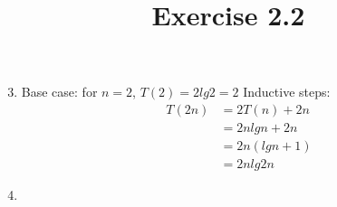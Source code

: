 \documentclass{article}
\title{Exercise 2.2}
\begin{document}
\maketitle

\begin{enumerate}
    \setcounter{enumi}{2}
    
    \item 
    Base case: for $n=2$, $T(2) = 2lg2 = 2$ \newline
    Inductive steps: 
    \begin{equation*}
        \begin{split}
            T(2n) & = 2T(n)+2n\\
             & =  2nlgn+2n\\
             & = 2n(lgn+1)\\
             & = 2nlg2n
        \end{split}
    \end{equation*}
    \item
\end{enumerate}
\end{document}
